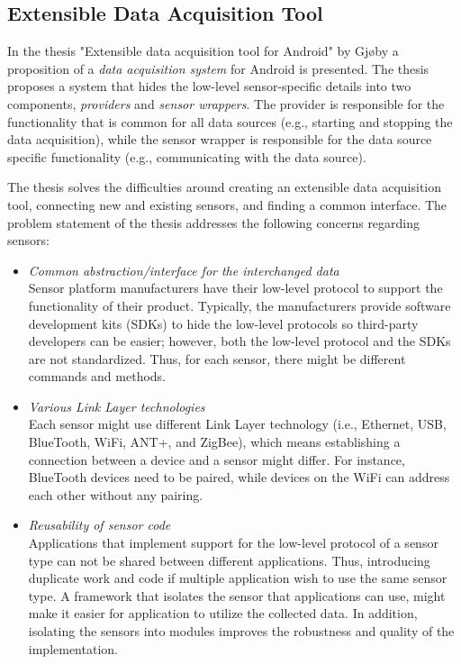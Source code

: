 \subsection{Extensible Data Acquisition Tool} \label{background:svein}
In the thesis "Extensible data acquisition tool for Android" by Gjøby \cite{gjoby} a proposition of a \textit{data acquisition system} for Android is presented. The thesis proposes a system that hides the low-level sensor-specific details into two components, \textit{providers} and \textit{sensor wrappers}. The provider is responsible for the functionality that is common for all data sources (e.g., starting and stopping the data acquisition), while the sensor wrapper is responsible for the data source specific functionality (e.g., communicating with the data source).

The thesis solves the difficulties around creating an extensible data acquisition tool, connecting new and existing sensors, and finding a common interface. The problem statement of the thesis addresses the following concerns regarding sensors:
\begin{itemize}
    \item \textit{Common abstraction/interface for the interchanged data}\\ 
    Sensor platform manufacturers have their low-level protocol to support the functionality of their product. Typically, the manufacturers provide software development kits (SDKs) to hide the low-level protocols so third-party developers can be easier; however, both the low-level protocol and the SDKs are not standardized. Thus, for each sensor, there might be different commands and methods.
    \item \textit{Various Link Layer technologies} \\ 
    Each sensor might use different Link Layer technology (i.e., Ethernet, USB, BlueTooth, WiFi, ANT+, and ZigBee), which means establishing a connection between a device and a sensor might differ. For instance, BlueTooth devices need to be paired, while devices on the WiFi can address each other without any pairing. 
    \item \textit{Reusability of sensor code}\\
    Applications that implement support for the low-level protocol of a sensor type can not be shared between different applications. Thus, introducing duplicate work and code if multiple application wish to use the same sensor type. A framework that isolates the sensor that applications can use, might make it easier for application to utilize the collected data. In addition, isolating the sensors into modules improves the robustness and quality of the implementation. 
    
\end{itemize}

